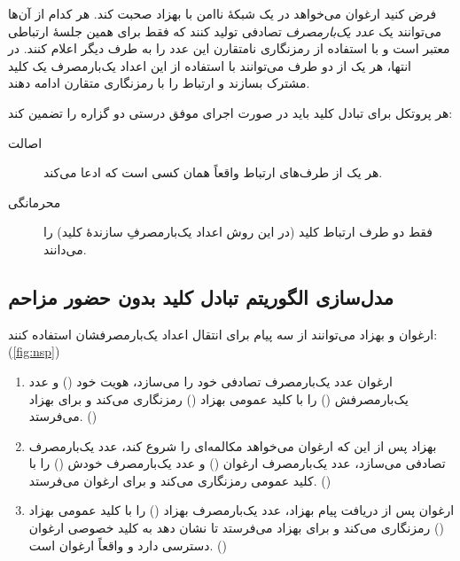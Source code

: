 \documentclass[a4paper]{article}
\begin{document}
فرض کنید ارغوان می‌خواهد در یک شبکهٔ ناامن با بهزاد صحبت کند.
هر کدام از آن‌ها می‌توانند
یک \textit{عدد یک‌بارمصرف} تصادفی تولید کنند که فقط برای همین جلسهٔ ارتباطی معتبر است
و با استفاده از رمزنگاری نامتقارن
این عدد را به طرف دیگر اعلام کنند.
در انتها، هر یک از دو طرف می‌توانند با استفاده از این اعداد یک‌بارمصرف یک کلید مشترک بسازند
و ارتباط را با رمزنگاری متقارن ادامه دهند.

هر پروتکل برای تبادل کلید باید در صورت اجرای موفق درستی دو گزاره را تضمین کند:
\begin{description}
    \item[اصالت] هر یک از طرف‌های ارتباط واقعاً همان کسی است که ادعا می‌کند.
    \item[محرمانگی] فقط دو طرف ارتباط کلید (در این روش اعداد یک‌بارمصرفِ سازندهٔ کلید) را می‌دانند.
\end{description}

\subsection{مدل‌سازی الگوریتم تبادل کلید بدون حضور مزاحم}

ارغوان و بهزاد می‌توانند از سه پیام برای انتقال اعداد یک‌بارمصرفشان استفاده کنند: (\autoref{fig:nsp})
\begin{enumerate}
    \item ارغوان عدد یک‌بارمصرف تصادفی خود را می‌سازد، هویت خود () و عدد یک‌بارمصرفش () را با کلید عمومی بهزاد () رمزنگاری می‌کند و برای بهزاد می‌فرستد. ()
    \item بهزاد پس از این که ارغوان می‌خواهد مکالمه‌ای را شروع کند، عدد یک‌بارمصرف تصادفی می‌سازد، عدد یک‌بارمصرف ارغوان () و عدد یک‌بارمصرف خودش () را با کلید عمومی  رمزنگاری می‌کند و برای ارغوان می‌فرستد. ()
    \item ارغوان پس از دریافت پیام بهزاد، عدد یک‌بارمصرف بهزاد () را با کلید عمومی بهزاد () رمزنگاری می‌کند و برای بهزاد می‌فرستد تا نشان دهد به کلید خصوصی ارغوان دسترسی دارد و واقعاً ارغوان است. ()
\end{enumerate}
\end{document}
